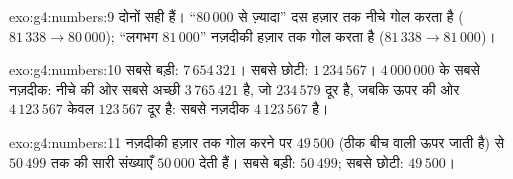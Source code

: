 \begin{solution}{exo:g4:numbers:9}
दोनों सही हैं। ``$80\,000$ से ज़्यादा'' दस हज़ार तक नीचे गोल
करता है ($81\,338 \to 80\,000$); ``लगभग $81\,000$'' नज़दीकी
हज़ार तक गोल करता है ($81\,338 \to 81\,000$)।
\end{solution}

\begin{solution}{exo:g4:numbers:10}
सबसे बड़ी: $7\,654\,321$। सबसे छोटी: $1\,234\,567$।
$4\,000\,000$ के सबसे नज़दीक: नीचे की ओर सबसे अच्छी $3\,765\,421$
है, जो $234\,579$ दूर है, जबकि ऊपर की ओर $4\,123\,567$ केवल
$123\,567$ दूर है: सबसे नज़दीक $4\,123\,567$ है।
\end{solution}

\begin{solution}{exo:g4:numbers:11}
नज़दीकी हज़ार तक गोल करने पर $49\,500$ (ठीक बीच वाली ऊपर जाती
है) से $50\,499$ तक की सारी संख्याएँ $50\,000$ देती हैं। सबसे
बड़ी: $50\,499$; सबसे छोटी: $49\,500$।
\end{solution}
